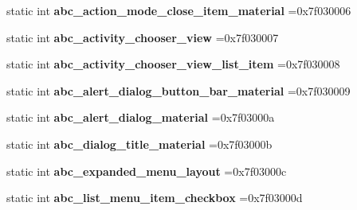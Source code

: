 \begin{DoxyCompactItemize}
\item 
\mbox{\label{classandroid_1_1support_1_1design_1_1R_1_1layout_a6a8f52a9bfa1fbeef8a67aa269115160}} 
static int {\bfseries abc\+\_\+action\+\_\+mode\+\_\+close\+\_\+item\+\_\+material} =0x7f030006
\item 
\mbox{\label{classandroid_1_1support_1_1design_1_1R_1_1layout_abadb2a6c8c955980f3e945f32e1533e0}} 
static int {\bfseries abc\+\_\+activity\+\_\+chooser\+\_\+view} =0x7f030007
\item 
\mbox{\label{classandroid_1_1support_1_1design_1_1R_1_1layout_a075fa19f75b0c06c3d69a6534688588f}} 
static int {\bfseries abc\+\_\+activity\+\_\+chooser\+\_\+view\+\_\+list\+\_\+item} =0x7f030008
\item 
\mbox{\label{classandroid_1_1support_1_1design_1_1R_1_1layout_a03fb19e33720ace8ae962a3433740f52}} 
static int {\bfseries abc\+\_\+alert\+\_\+dialog\+\_\+button\+\_\+bar\+\_\+material} =0x7f030009
\item 
\mbox{\label{classandroid_1_1support_1_1design_1_1R_1_1layout_add2026e8d9e50651b8703a973a2cabb4}} 
static int {\bfseries abc\+\_\+alert\+\_\+dialog\+\_\+material} =0x7f03000a
\item 
\mbox{\label{classandroid_1_1support_1_1design_1_1R_1_1layout_a58e48d11e6f00ff1d3455daacfef7d04}} 
static int {\bfseries abc\+\_\+dialog\+\_\+title\+\_\+material} =0x7f03000b
\item 
\mbox{\label{classandroid_1_1support_1_1design_1_1R_1_1layout_ac689ce401f4f5cbaffcfb33b0167e681}} 
static int {\bfseries abc\+\_\+expanded\+\_\+menu\+\_\+layout} =0x7f03000c
\item 
\mbox{\label{classandroid_1_1support_1_1design_1_1R_1_1layout_a9a8ef5e34df1756a40da71b4e5cf0bed}} 
static int {\bfseries abc\+\_\+list\+\_\+menu\+\_\+item\+\_\+checkbox} =0x7f03000d

\end{DoxyCompactItemize}

